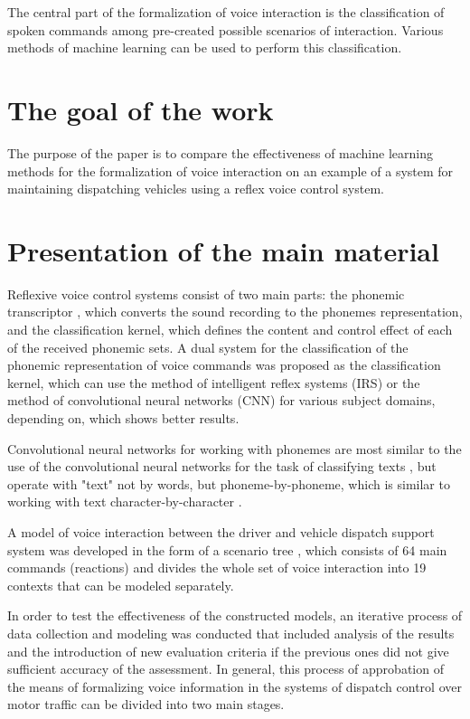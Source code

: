 The central part of the formalization of voice interaction is the classification of spoken commands among pre-created possible scenarios of interaction. Various methods of machine learning can be used to perform this classification.

\section{The goal of the work}

The purpose of the paper is to compare the effectiveness of machine learning methods for the formalization of voice interaction on an example of a system for maintaining dispatching vehicles using a reflex voice control system.

\section{Presentation of the main material}

Reflexive voice control systems consist of two main parts: the phonemic transcriptor \cite{eng_Pylypenko_2008}, which converts the sound recording to the phonemes representation, and the classification kernel, which defines the content and control effect of each of the received phonemic sets. A dual system for the classification of the phonemic representation of voice commands \cite{eng_art4} was proposed as the classification kernel, which can use the method of intelligent reflex systems (IRS) \cite{eng_Egorchenkov_2016} or the method of convolutional neural networks (CNN) for various subject domains, depending on, which shows better results.

Convolutional neural networks for working with phonemes are most similar to the use of the  convolutional neural networks for the task of classifying texts \cite{Kim_2014}, but operate with "text" not by words, but phoneme-by-phoneme, which is similar to working with text character-by-character \cite{Zhang_2015}.

A model of voice interaction between the driver and vehicle dispatch support system was developed in the form of a scenario tree \cite{eng_art4}, which consists of 64 main commands (reactions) and divides the whole set of voice interaction into 19 contexts that can be modeled separately.

In order to test the effectiveness of the constructed models, an iterative process of data collection and modeling was conducted that included analysis of the results and the introduction of new evaluation criteria if the previous ones did not give sufficient accuracy of the assessment. In general, this process of approbation of the means of formalizing voice information in the systems of dispatch control over motor traffic can be divided into two main stages.

